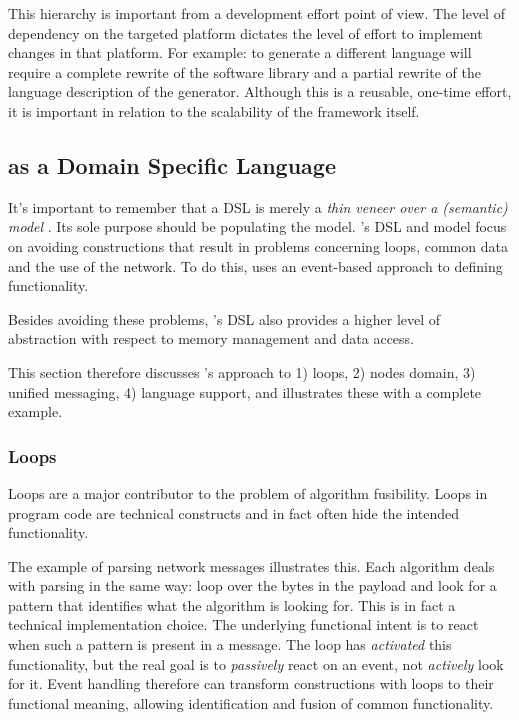 \documentclass[3p,times,procedia]{elsarticle}
\begin{document}
This hierarchy is important from a development effort point of view. The level
of dependency on the targeted platform dictates the level of effort to
implement changes in that platform. For example: to generate a different
language will require a complete rewrite of the software library and a partial
rewrite of the language description of the generator. Although this is a
reusable, one-time effort, it is important in relation to the scalability of
the framework itself.

\subsection{\NAME as a Domain Specific Language}
\label{dsl-design}

It's important to remember that a DSL is merely a \emph{thin veneer over a
(semantic) model} \cite{fowler2010domain}. Its sole purpose should be
populating the model. \NAME's DSL and model focus on avoiding constructions
that result in problems concerning loops, common data and the use of the
network. To do this, \NAME uses an event-based approach to defining
functionality.

Besides avoiding these problems, \NAME's DSL also provides a higher level of
abstraction with respect to memory management and data access.

This section therefore discusses \NAME's approach to 1) loops, 2) nodes domain,
3) unified messaging, 4) language support, and illustrates these with a
complete example.

\subsubsection{Loops}

Loops are a major contributor to the problem of algorithm fusibility. Loops in
program code are technical constructs and in fact often hide the intended
functionality.

The example of parsing network messages illustrates this. Each algorithm deals
with parsing in the same way: loop over the bytes in the payload and look for a
pattern that identifies what the algorithm is looking for. This is in fact a
technical implementation choice. The underlying functional intent is to react
when such a pattern is present in a message. The loop has \emph{activated} this
functionality, but the real goal is to \emph{passively} react on an event, not
\emph{actively} look for it. Event handling therefore can transform
constructions with loops to their functional meaning, allowing identification
and fusion of common functionality.
\end{document}
